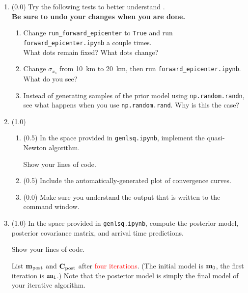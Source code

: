 \documentclass[11pt,titlepage,fleqn]{article}
\begin{document}
\begin{enumerate}

\item (0.0) Try the following tests to better understand . \\
{\bf Be sure to undo your changes when you are done.}
%
\begin{enumerate}
\item Change \verb+run_forward_epicenter+ to \verb+True+ and run \verb+forward_epicenter.ipynb+ a couple times. \\
What dots remain fixed? What dots change?

\item Change $\sigma_{x_s}$ from 10~km to 20~km, then run \verb+forward_epicenter.ipynb+. What do you see?

\item Instead of generating samples of the prior model using \verb+np.random.randn+, see what happens when you use \verb+np.random.rand+. Why is this the case?
\end{enumerate}

\item (1.0)
%
\begin{enumerate}
\item (0.5) In the space provided in \verb+genlsq.ipynb+, implement the quasi-Newton algorithm.

Show your lines of code.

\item (0.5) Include the automatically-generated plot of convergence curves.

\item (0.0) Make sure you understand the output that is written to the command window.
\end{enumerate}


\item (1.0) In the space provided in \verb+genlsq.ipynb+, compute the posterior model, posterior covariance matrix, and arrival time predictions.

Show your lines of code.

List $\mbox{${\bf m}$}_{\rm post}$ and $\mbox{${\bf C}$}_{\rm post}$ after \textcolor{red}{four iterations}. (The initial model is $\mbox{${\bf m}$}_0$, the first iteration is $\mbox{${\bf m}$}_1$.) Note that the posterior model is simply the final model of your iterative algorithm.



\end{enumerate}
\end{document}
